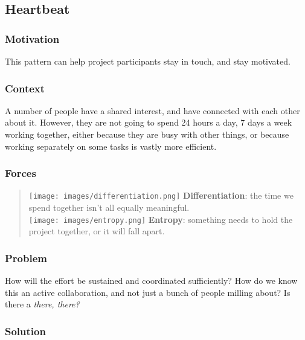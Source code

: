 \hypertarget{heartbeat}{%
\subsection{Heartbeat}\label{heartbeat}}

\hypertarget{motivation}{%
\subsubsection{Motivation}\label{motivation}}

This pattern can help project participants stay in touch, and stay
motivated.

\hypertarget{context}{%
\subsubsection{Context}\label{context}}

A number of people have a shared interest, and have connected with each
other about it. However, they are not going to spend 24 hours a day, 7
days a week working together, either because they are busy with other
things, or because working separately on some tasks is vastly more
efficient.

\hypertarget{forces}{%
\subsubsection{Forces}\label{forces}}

\begin{quote}
\texttt{[image: images/differentiation.png]} \textbf{Differentiation}:
the time we spend together isn't all equally meaningful.\\
\texttt{[image: images/entropy.png]} \textbf{Entropy}: something needs
to hold the project together, or it will fall apart.
\end{quote}

\hypertarget{problem}{%
\subsubsection{Problem}\label{problem}}

How will the effort be sustained and coordinated sufficiently? How do we
know this an active collaboration, and not just a bunch of people
milling about? Is there a \emph{there, there?}

\hypertarget{solution}{%
\subsubsection{Solution}\label{solution}}


